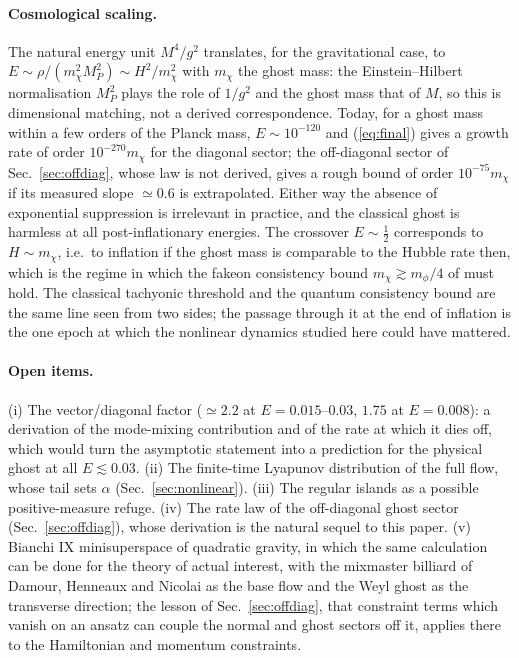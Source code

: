 \documentclass[11pt,a4paper]{article}
\begin{document}
\paragraph{Cosmological scaling.} The natural energy unit $M^4/g^2$ translates, for the
gravitational case, to $E\sim\rho/(m_\chi^2M_P^2)\sim H^2/m_\chi^2$ with $m_\chi$ the ghost mass:
the Einstein--Hilbert normalisation $M_P^2$ plays the role of $1/g^2$ and the ghost mass that of
$M$, so this is dimensional matching, not a derived correspondence. Today, for a ghost mass
within a few orders of the Planck mass,
$E\sim10^{-120}$ and (\ref{eq:final}) gives a growth rate of order $10^{-270}m_\chi$ for the
diagonal sector; the off-diagonal sector of Sec.~\ref{sec:offdiag}, whose law is not derived,
gives a rough bound of order $10^{-75}m_\chi$ if its measured slope $\simeq0.6$ is extrapolated.
Either way the absence of exponential suppression is irrelevant in practice, and the classical
ghost is harmless at all post-inflationary energies. The crossover $E\sim\tfrac12$ corresponds to $H\sim m_\chi$, i.e.\ to
inflation if the ghost mass is comparable to the Hubble rate then, which is the regime in which
the fakeon consistency bound $m_\chi\gtrsim m_\phi/4$ of \cite{ABP20} must hold. The classical
tachyonic threshold and the quantum consistency bound are the same line seen from two sides; the
passage through it at the end of inflation is the one epoch at which the nonlinear dynamics
studied here could have mattered.

\paragraph{Open items.} (i) The vector/diagonal factor ($\simeq2.2$ at $E=0.015$--$0.03$,
$1.75$ at $E=0.008$): a derivation of the mode-mixing contribution and of the rate at which it
dies off, which would turn the asymptotic statement into a prediction for the physical ghost at
all $E\lesssim0.03$. (ii) The finite-time Lyapunov distribution of the full flow,
whose tail sets $\alpha$ (Sec.~\ref{sec:nonlinear}). (iii) The regular islands as a possible
positive-measure refuge. (iv) The rate law of the off-diagonal ghost sector
(Sec.~\ref{sec:offdiag}), whose derivation is the natural sequel to this paper. (v) Bianchi IX
minisuperspace of quadratic gravity, in which the same calculation can be done for the theory of
actual interest, with the mixmaster billiard of Damour, Henneaux and Nicolai \cite{DHN03} as
the base flow and the Weyl ghost as the transverse direction; the lesson of
Sec.~\ref{sec:offdiag}, that constraint terms which vanish on an ansatz can couple the normal
and ghost sectors off it, applies there to the Hamiltonian and momentum constraints.
\end{document}

